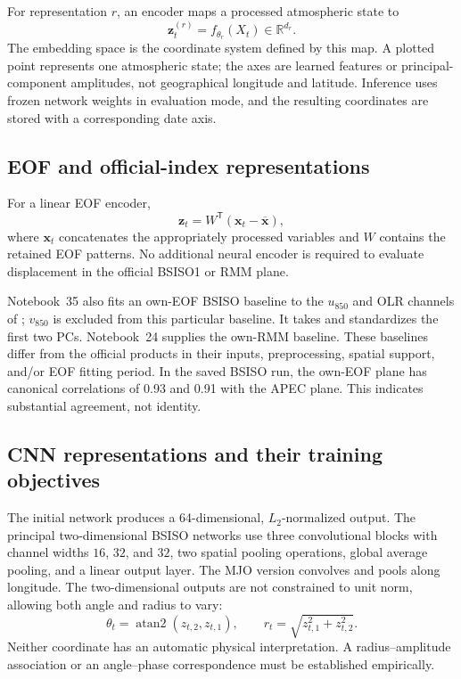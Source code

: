 \documentclass[11pt]{article}
\newcommand{\R}{\mathbb{R}}
\newcommand{\code}[1]{\texttt{\detokenize{#1}}}
\begin{document}
For representation $r$, an encoder maps a processed atmospheric state to
\begin{equation}
\mathbf z_t^{(r)}=f_{\theta_r}(X_t)\in\R^{d_r}.
\label{eq:encoder}
\end{equation}
The embedding space is the coordinate system defined by this map. A plotted point represents one atmospheric state; the axes are learned features or principal-component amplitudes, not geographical longitude and latitude. Inference uses frozen network weights in evaluation mode, and the resulting coordinates are stored with a corresponding date axis.

\subsection{EOF and official-index representations}

For a linear EOF encoder,
\begin{equation}
\mathbf z_t=W^\mathsf{T}(\mathbf x_t-\overline{\mathbf x}),
\end{equation}
where $\mathbf x_t$ concatenates the appropriately processed variables and $W$ contains the retained EOF patterns. No additional neural encoder is required to evaluate displacement in the official BSISO1 or RMM plane.

Notebook~35 also fits an own-EOF BSISO baseline to the $u_{850}$ and OLR channels of \code{X_MJJAS_lee.npy}; $v_{850}$ is excluded from this particular baseline. It takes and standardizes the first two PCs. Notebook~24 supplies the own-RMM baseline. These baselines differ from the official products in their inputs, preprocessing, spatial support, and/or EOF fitting period. In the saved BSISO run, the own-EOF plane has canonical correlations of 0.93 and 0.91 with the APEC plane. This indicates substantial agreement, not identity.

\subsection{CNN representations and their training objectives}

The initial network produces a 64-dimensional, $L_2$-normalized output. The principal two-dimensional BSISO networks use three convolutional blocks with channel widths $16$, $32$, and $32$, two spatial pooling operations, global average pooling, and a linear output layer. The MJO version convolves and pools along longitude. The two-dimensional outputs are not constrained to unit norm, allowing both angle and radius to vary:
\begin{equation}
\theta_t=\operatorname{atan2}(z_{t,2},z_{t,1}),
\qquad r_t=\sqrt{z_{t,1}^2+z_{t,2}^2}.
\end{equation}
Neither coordinate has an automatic physical interpretation. A radius--amplitude association or an angle--phase correspondence must be established empirically.
\end{document}
